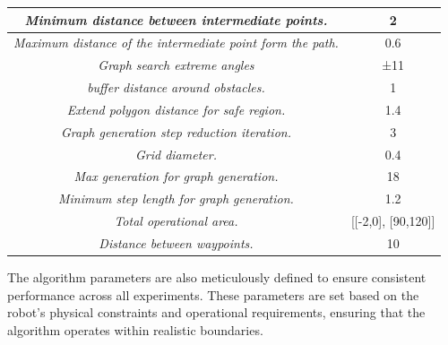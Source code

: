 \begin{table}[]
\begin{tabular}{|c|c|}
    \rowcolor[HTML]{CBF9FC} 
    \textit{Minimum distance between intermediate points.}                          & 2                              \\ \hline
    \rowcolor[HTML]{CBF9FC} 
    \textit{Maximum distance of the intermediate point form the path.}              & 0.6                            \\ \hline
    \rowcolor[HTML]{CBF9FC} 
    \textit{Graph search extreme angles}                                            & ±11                            \\ \hline
    \rowcolor[HTML]{CBF9FC} 
    \textit{buffer distance around obstacles.}                                      & 1                              \\ \hline
    \rowcolor[HTML]{CBF9FC} 
    \textit{Extend polygon distance for safe region.}                               & 1.4                            \\ \hline
    \rowcolor[HTML]{CBF9FC} 
    \textit{Graph generation step reduction iteration.}                             & 3                              \\ \hline
    \rowcolor[HTML]{CBF9FC} 
    \textit{Grid diameter.}                                                         & 0.4                            \\ \hline
    \rowcolor[HTML]{CBF9FC} 
    \textit{Max generation for graph generation.}                                   & 18                             \\ \hline
    \rowcolor[HTML]{CBF9FC} 
    \textit{Minimum step length for graph generation.}                              & 1.2                            \\ \hline
    \rowcolor[HTML]{CBF9FC} 
    \textit{Total operational area.}                                                & {[}{[}-2,0{]}, {[}90,120{]}{]} \\ \hline
    \rowcolor[HTML]{CBF9FC} 
    \textit{Distance between waypoints.}                                            & 10                             \\ \hline
    \end{tabular}
    \end{table}


The algorithm parameters are also meticulously defined to ensure consistent performance across all experiments. These parameters are set based on the robot's physical constraints and operational requirements, ensuring that the algorithm operates within realistic boundaries.

